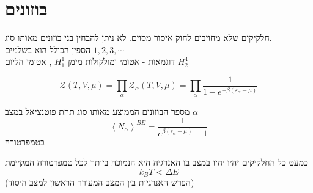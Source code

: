 \section{בוזונים}
חלקיקים שלא מחויבים לחוק איסור מסוים. 
לא ניתן להבחין בני בוזונים מאותו סוג.\\
הספין הכולל הוא בשלמים $1,2,3,\cdots$\\
דוגמאות - אטומי ומולקולות מימן $H^1_1$ , אטומי הליום $H^4_2$
\\
\begin{cheatformula}
$$\mathcal{Z}\left(T,V,\mu\right) = \prod_\alpha \mathcal{Z}_\alpha \left(T,V,\mu\right) = \prod_\alpha \frac{1}{1-e^{-\beta \left( \varepsilon_\alpha - \mu \right)}}$$
\end{cheatformula}

\begin{cheatformula}
מספר הבוזונים הממוצע מאותו סוג תחת פוטנציאל במצב $\alpha$ 
    $$\left<N_\alpha \right>^{BE} = \frac{1}{e^{\beta \left(\epsilon_\alpha -\mu \right) }-1}$$
בטמפרטורה
\end{cheatformula}
\begin{cheatformula}
כמעט כל החלקיקים יהיו יהיו במצב בו האנרגיה היא הנמוכה ביותר לכל טמפרטורה המקיימת
$$k_B T < \Delta E$$
(הפרש האנרגיות בין המצב המעורר הראשון למצב היסוד)

\end{cheatformula}

